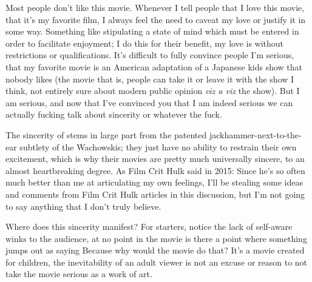 \documentclass[../butidigress.tex]{subfiles}
\begin{document}
Most people don't like this movie.
Whenever I tell people that I love this movie, that it's my favorite film, I always feel the need to caveat my love or justify it in some way.
Something like stipulating a state of mind which must be entered in order to facilitate enjoyment; I do this for their benefit, my love is without restrictions or qualifications.
It's difficult to fully convince people I'm serious, that my favorite movie is an American adaptation of a Japanese kids show that nobody likes (the movie that is, people can take it or leave it with the show I think, not entirely sure about modern public opinion \textit{viz a viz} the show).
But I am serious, and now that I've convinced you that I am indeed serious we can actually fucking talk about sincerity or whatever the fuck.

\entryskip

The sincerity of  stems in large part from the patented jackhammer-next-to-the-ear subtlety of the Wachowskis; they just have no ability to restrain their own excitement, which is why their movies are pretty much universally sincere, to an almost heartbreaking degree.
As Film Crit Hulk said in 2015: \autocite{hulkspeedracer2015}
Since he's so often much better than me at articulating my own feelings, I'll be stealing some ideas and comments from Film Crit Hulk articles in this discussion, but I'm not going to say anything that I don't truly believe.

Where does this sincerity manifest?
For starters, notice the lack of self-aware winks to the audience, at no point in the movie is there a point where something jumps out as saying 
Because why would the movie do that?
It's a movie created for children, the inevitability of an adult viewer is not an excuse or reason to not take the movie serious as a work of art.
\autocite{hulkspeedracer2013}
\end{document}
